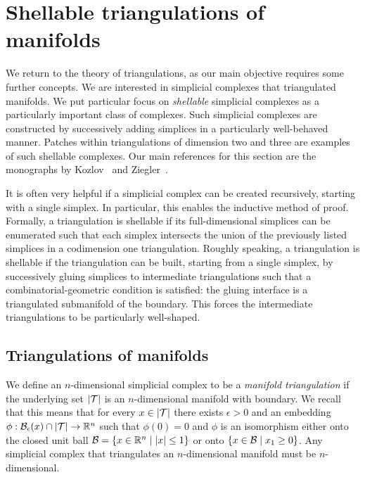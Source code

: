 \documentclass[12pt,a4paper]{article}
\begin{document}
\section{Shellable triangulations of manifolds}\label{section:advancedtriangulations}

We return to the theory of triangulations,
as our main objective requires some further concepts.
We are interested in simplicial complexes that triangulated manifolds. 
We put particular focus on \emph{shellable} simplicial complexes as a particularly important class of complexes. Such simplicial complexes are constructed by successively adding simplices in a particularly well-behaved manner. Patches within triangulations of dimension two and three are examples of such shellable complexes. 
Our main references for this section are the monographs by Kozlov~\cite{kozlov2008combinatorial} and Ziegler~\cite{ziegler2012lectures}. 

\begin{remark}
It is often very helpful if a simplicial complex can be created recursively, starting with a single simplex. In particular, this enables the inductive method of proof.
Formally, a triangulation is shellable if its full-dimensional simplices can be enumerated such that each simplex intersects the union of the previously listed simplices in a codimension one triangulation. 
Roughly speaking, a triangulation is shellable if the triangulation can be built, starting from a single simplex,
by successively gluing simplices to intermediate triangulations such that a combinatorial-geometric condition is satisfied:
the gluing interface is a triangulated submanifold of the boundary. 
This forces the intermediate triangulations to be particularly well-shaped. 
\end{remark}

\subsection{Triangulations of manifolds}

We define an $n$-dimensional simplicial complex to be a \emph{manifold triangulation} if the underlying set $\left| {\mathcal T} \right|$ is an $n$-dimensional manifold with boundary.
We recall that this means that for every $x \in \left| {\mathcal T} \right|$
there exists $\epsilon > 0$ and an embedding $\phi : {\mathcal B}_\epsilon(x) \cap \left| {\mathcal T} \right| \rightarrow {\mathbb R}^{n}$
such that $\phi(0) = 0$ and $\phi$ is an isomorphism either onto the closed unit ball $\calB = \{ x \in \bbR^{n} \suchthat |x| \leq 1 \}$
or onto $\{ x \in \calB \suchthat x_1 \geq 0 \}$.
Any simplicial complex that triangulates an $n$-dimensional manifold must be $n$-dimensional.
\end{document}
